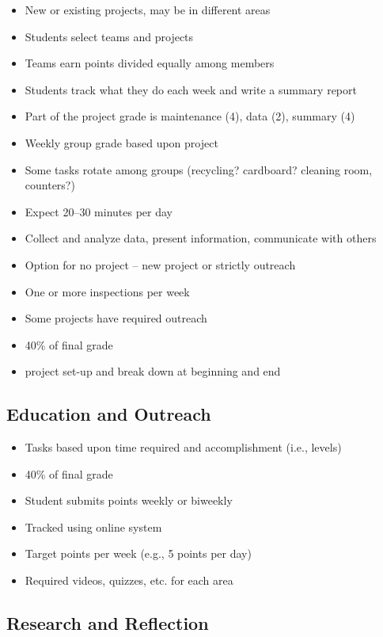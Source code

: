 \documentclass[letterpaper,10pt]{memoir}
\begin{document}
\begin{itemize}[label=$-$,nosep]
\item New or existing projects, may be in different areas
\item Students select teams and projects
\item Teams earn points divided equally among members
\item Students track what they do each week and write a summary report
\item Part of the project grade is maintenance (4), data (2), summary (4)
\item Weekly group grade based upon project
\item Some tasks rotate among groups (recycling? cardboard? cleaning room, counters?)
\item Expect 20--30 minutes per day
\item Collect and analyze data, present information, communicate with others
\item Option for no project -- new project or strictly outreach
\item One or more inspections per week
\item Some projects have required outreach
\item 40\% of final grade
\item project set-up and break down at beginning and end
\end{itemize}


\subsection*{Education and Outreach}

\begin{itemize}[label=$-$,nosep]
\item Tasks based upon time required and accomplishment (i.e., levels)
\item 40\% of final grade
\item Student submits points weekly or biweekly
\item Tracked using online system
\item Target points per week (e.g., 5 points per day)
\item Required videos, quizzes, etc. for each area
\end{itemize}


\subsection*{Research and Reflection}
\end{document}
